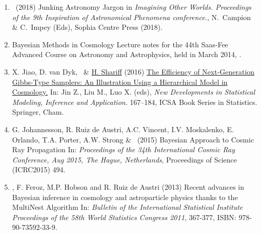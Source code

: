 \begin{enumerate}

\item 
\paper
{\rt\ (2018)}
{Junking Astronomy Jargon}
{in {\it Imagining Other Worlds. Proceedings of the 9th Inspiration of Astronomical Phenomena conference.}, N.~Campion \& C.~Impey (Eds), Sophia Centre Press (2018).}

\item 
\onestar 
{}
{Bayesian Methods in Cosmology}
{Lecture notes for the 44th Saas-Fee Advanced Course on Astronomy and Astrophysics, held in March 2014, .}


\item 
\paper 
{X. Jiao, D. van Dyk, \rt\ \& \ul{H. Shariff} (2016)}
{\href{https://doi.org/10.1007/978-3-319-42571-9_9}{The Efficiency of Next-Generation Gibbs-Type Samplers: An Illustration Using a Hierarchical Model in Cosmology.}}
{In: Jin Z., Liu M., Luo X. (eds), {\it New Developments in Statistical Modeling, Inference and Application}. 167–184, ICSA Book Series in Statistics. Springer, Cham.}

 
\item 
\paper
{G. Johannesson, R. Ruiz de Austri, A.C. Vincent, I.V. Moskalenko,  E. Orlando, T.A. Porter,  A.W. Strong \& \rt\  (2015)}
{Bayesian Approach to Cosmic Ray Propagation} 
{In: {\em Proceedings of the 34th International Cosmic Ray Conference, Aug 2015, The Hague, Netherlands}, Proceedings of Science (ICRC2015) 494.}

 
\item 
\paper
{\rt, F. Feroz, M.P. Hobson and R. Ruiz de Austri (2013)}
{Recent advances in Bayesian inference in cosmology and astroparticle physics thanks to the MultiNest Algorithm} 
{In: {\em Bulletin of the International Statistical Institute Proceedings of the 58th World Statistics Congress 2011}, 367-377, ISBN: 978-90-73592-33-9.}


\end{enumerate}
